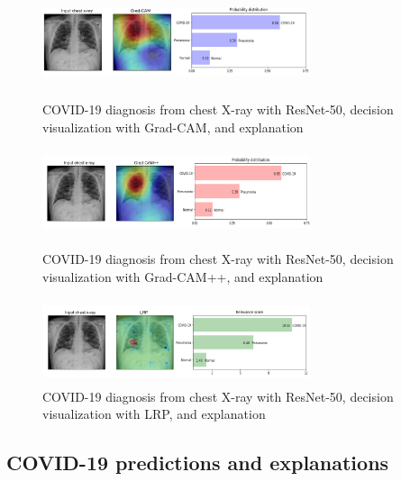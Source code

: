 \documentclass[conference]{IEEEtran}
\begin{document}
\begin{figure}
	\centering
    	\includegraphics[width=0.7\textwidth,height=25mm]{cam.png}
    	\caption{COVID-19 diagnosis from chest X-ray with ResNet-50, decision visualization with Grad-CAM, and explanation}
    	\label{Fig:ggcam_viz}
    	\smallskip
    	\includegraphics[width=0.7\textwidth,height=25mm]{cam_plus.png}
    	\caption{COVID-19 diagnosis from chest X-ray with ResNet-50, decision visualization with Grad-CAM++, and explanation}
    	\label{Fig:ggcam_plus_viz}
    	\smallskip
    	\includegraphics[width=0.7\textwidth,height=25mm]{lrp.png}
    	\caption{COVID-19 diagnosis from chest X-ray with ResNet-50, decision visualization with LRP, and explanation}
    	\label{Fig:lrp_viz}
    	\vspace{-2mm}
\end{figure}

\subsection{COVID-19 predictions and explanations}
\label{sub:expl}
\end{document}
